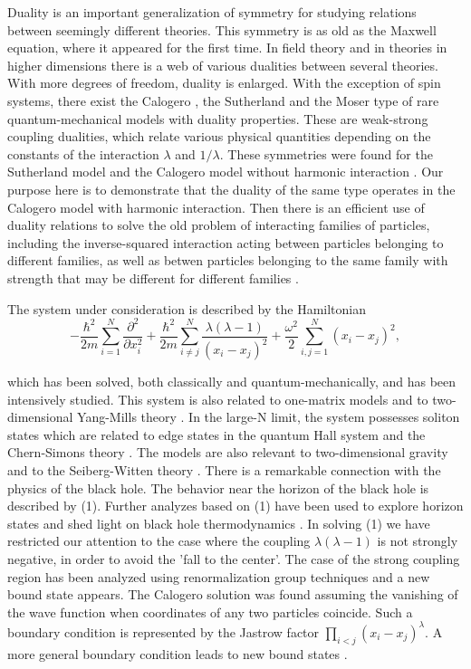 \documentclass[a4paper,preprint,aps]{revtex4}
\begin{document}
Duality is an important generalization of symmetry for studying relations
 between seemingly different theories. This symmetry is as old as the Maxwell 
equation, where it appeared for the first time. In field theory and in 
theories in higher dimensions there is a web of various dualities between 
several theories. With more degrees of freedom, duality is enlarged. With 
the exception of spin systems, there exist the Calogero \cite{C}, the
 Sutherland \cite{S} and the Moser \cite{M}
 type of rare quantum-mechanical models with duality properties.
 These are weak-strong coupling dualities, which relate various physical
 quantities depending on the constants of the interaction $\lambda$ and
 $1/\lambda$. These symmetries were found for the Sutherland \cite{G,MP1}
 model and the Calogero model without harmonic interaction \cite{AJ}. Our
 purpose here is to demonstrate that the duality of the same type operates in
 the Calogero model with harmonic interaction. Then there is an efficient
 use of duality relations to solve the old problem of interacting families of
 particles, including the inverse-squared interaction acting between
 particles belonging to different families, as well as betwen particles 
 belonging to the same family with strength that may be different for
 different families \cite{C}.
  
\indent
The system under consideration is described by the Hamiltonian
 \begin{equation}  
	- \frac{\hbar^{2}}{2m} 
	\sum_{i=1}^{N} \frac {\partial ^{2}}{\partial x_{i}^2} +
	\frac{\hbar^{2}}{2m}
	\sum_{i\neq j}^{N} 
	\frac {\lambda(\lambda-1)}{(x_{i}-x_{j})^{2}}+
	\frac{\omega^{2}}{2} \sum_{i,j=1}^{N} (x_{i}-x_{j})^{2},	
\end{equation}

which has been solved, both classically \cite{OP} and quantum-mechanically, and
has been intensively studied. This system is also related to one-matrix models
 \cite{MBIPZ,AJL} and to  two-dimensional Yang-Mills theory \cite{MP2}.
 In the large-N limit, the system possesses soliton states \cite{JPABJ} which
 are related to edge states in the quantum Hall system \cite{KAI} and the
 Chern-Simons theory \cite{ABJ}. The models are also relevant to  
 two-dimensional gravity \cite{GT} and to the Seiberg-Witten theory \cite{HP}.
 There is a remarkable connection with the physics of the black hole. The
 behavior near the horizon of the black hole is described by (1). Further
 analyzes based on (1) have been used to explore horizon states \cite{GSV,BGS}
 and shed light on black hole thermodynamics \cite{BGS}. In solving (1) we have
 restricted our attention to the case where the coupling $\lambda (\lambda-1)$
 is not strongly negative, in order to avoid the 'fall to the center'. The
 case of the strong coupling region has been analyzed using renormalization
 group techniques \cite{GR} and a new bound state appears. The Calogero
 solution was found assuming the vanishing of the wave function when
 coordinates of any two particles coincide. Such a boundary condition is
 represented by the Jastrow factor $\prod_{i<j} (x_{i}-x_{j})^{\lambda}$.
 A more general boundary condition leads to  new bound
 states \cite{GR,BMGG}.     
\end{document}
